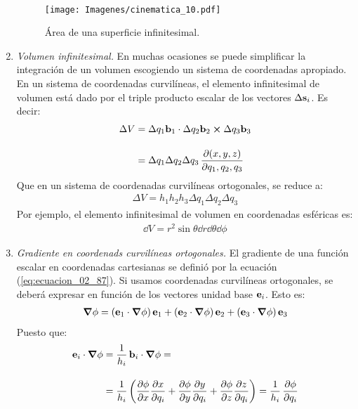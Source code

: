 \begin{enumerate}
\begin{align}
    \label{eq:ecuacion_02_92}
\end{align}
\begin{figure}[H]
\centering
\texttt{[image: Imagenes/cinematica\_10.pdf]}
\caption{Área de una superficie infinitesimal.}
\label{fig:figura_02_10}
\end{figure}
\item \emph{Volumen infinitesimal. } En muchas ocasiones se puede simplificar la  integración de un volumen escogiendo un sistema de coordenadas apropiado. En un sistema de coordenadas curvilíneas, el elemento infinitesimal de volumen está dado por el triple producto escalar de los vectores $\Delta \vb{s}_{i}$. Es decir:
\begin{align}
\begin{aligned}[b]
    \Delta V &= \Delta q_{1} \vb{b}_{1} \cdot \Delta q_{2} \vb{b}_{2} \cp \Delta q_{3} \vb{b}_{3} \\[1em]
    &= \Delta q_{1} \Delta q_{2} \Delta q_{3} \, \pdv{(x, y, z)}{q_{1}, q_{2}, q_{3}}
\end{aligned}
\label{eq:ecuacion_02_93}
\end{align}
Que en un sistema de coordenadas curvilíneas ortogonales, se reduce a:
\begin{align}
    \Delta V = h_{1} h_{2} h_{3} \Delta q_{1} \Delta q_{2} \Delta q_{3}
    \label{eq:ecuacion_02_94}
\end{align}
Por ejemplo, el elemento infinitesimal de volumen en coordenadas esféricas es:
\begin{align*}
    \dd{V} = r^{2} \sin \theta \dd{r} \dd{\theta} \dd{\phi}
\end{align*}
\item \emph{Gradiente en coordenads curvilíneas ortogonales. } El gradiente de una función escalar en coordenadas cartesianas se definió por la ecuación (\ref{eq:ecuacion_02_87}). Si usamos coordenadas curvilíneas ortogonales, se deberá expresar en función de los vectores unidad base $\vb{e}_{i}$. Esto es:
\begin{align*}
    \grad{\phi} = \left( \vb{e}_{1} \cdot \grad{\phi} \right) \vb{e}_{1} + \left( \vb{e}_{2} \cdot \grad{\phi} \right) \vb{e}_{2} + \left( \vb{e}_{3} \cdot \grad{\phi} \right) \vb{e}_{3}
\end{align*}
Puesto que:
\begin{align*}
    \vb{e}_{i} \cdot \grad{\phi} &= \dfrac{1}{h_{i}} \, \vb{b}_{i} \cdot \grad{\phi} = \\[1em]
    &= \dfrac{1}{h_{i}} \left( \pdv{\phi}{x} \pdv{x}{q_{i}} + \pdv{\phi}{y} \pdv{y}{q_{i}} + \pdv{\phi}{z} \pdv{z}{q_{i}} \right) = \dfrac{1}{h_{i}} \, \pdv{\phi}{q_{i}}

\end{align*}
\end{enumerate}
